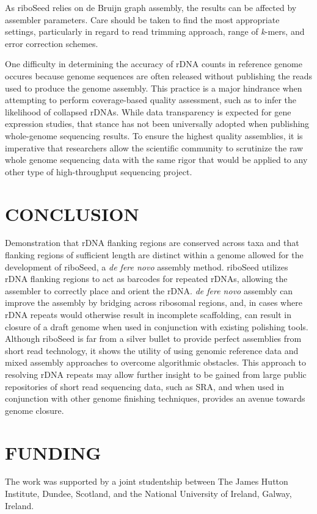 \documentclass[a4,center,fleqn]{NAR}
\begin{document}
As riboSeed relies on de Bruijn graph assembly, the results can be affected by assembler parameters. Care should be taken to find the most appropriate settings, particularly in regard to read trimming approach, range of \textit{k}-mers, and error correction schemes.

One difficulty in determining the accuracy of rDNA counts in reference genome occures because genome sequences are often released without publishing the reads used to produce the genome assembly. This practice is a major hindrance when attempting to perform coverage-based quality assessment, such as to infer the likelihood of collapsed rDNAs. While data transparency is expected for gene expression studies, that stance has not been universally adopted when publishing whole-genome sequencing results. To ensure the highest quality assemblies, it is imperative that researchers allow the scientific community to scrutinize the raw whole genome sequencing data with the same rigor that would be applied to any other type of high-throughput sequencing project.




\section*{CONCLUSION}
Demonstration that rDNA flanking regions are conserved across taxa and that flanking regions of sufficient length are distinct within a genome allowed for the development of riboSeed, a \textit{de fere novo} assembly method. riboSeed  utilizes rDNA flanking regions to act as barcodes for repeated rDNAs, allowing the assembler to correctly place and orient the rDNA. \textit{de fere novo} assembly can improve the assembly by bridging across ribosomal regions, and, in cases where rDNA repeats would otherwise result in incomplete scaffolding, can result in closure of a draft genome when used in conjunction with existing polishing tools. Although riboSeed is far from a silver bullet to provide perfect assemblies from short read technology, it shows the utility of using genomic reference data and mixed assembly approaches to overcome algorithmic obstacles. This approach to resolving rDNA repeats may allow further insight to be gained from large public repositories of short read sequencing data, such as SRA, and when used in conjunction with other genome finishing techniques, provides an avenue towards genome closure.

\section{FUNDING}
The work was supported by a joint studentship between The James Hutton Institute, Dundee, Scotland, and the National University of Ireland, Galway, Ireland.
\end{document}
